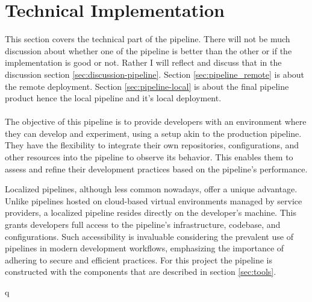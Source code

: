 \chapter{Technical Implementation}
\label{sec:technical_implementation}
This section covers the technical part of the pipeline. There will not be much discussion about 
whether one of the pipeline is better than the other or if the implementation is good or not.
Rather I will reflect and discuss that in 
the discussion section \ref{sec:discussion-pipeline}.
Section \ref{sec:pipeline_remote} is about the remote deployment.
Section \ref{sec:pipeline-local} is about the final pipeline product hence 
the local pipeline and it's local deployment.\\\\
The objective of this pipeline is to provide developers with an environment where they can develop and experiment, 
using a setup akin to the production pipeline. They have the flexibility to integrate their own repositories, 
configurations, and other resources into the pipeline to observe its behavior. This enables them to assess and 
refine their development practices based on the pipeline's performance.

Localized pipelines, although less common nowadays, offer a unique advantage. Unlike pipelines hosted on 
cloud-based virtual environments managed by service providers, a localized pipeline resides directly on the developer's machine. 
This grants developers full access to the pipeline's infrastructure, codebase, and configurations. Such accessibility is invaluable 
considering the prevalent use of pipelines 
in modern development workflows, emphasizing the importance of adhering to secure and efficient practices.
For this project the pipeline is constructed with the components that are described in section \ref{sec:tools}.



\newpage


\newpage

q

